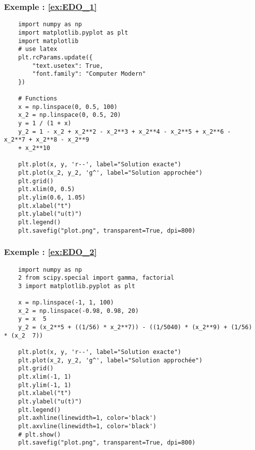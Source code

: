 \subsubsection*{Exemple : \ref{ex:EDO_1}}

\noindent
\begin{verbatim}
    import numpy as np
    import matplotlib.pyplot as plt
    import matplotlib
    # use latex
    plt.rcParams.update({
        "text.usetex": True,
        "font.family": "Computer Modern"
    })
    
    # Functions
    x = np.linspace(0, 0.5, 100)
    x_2 = np.linspace(0, 0.5, 20)
    y = 1 / (1 + x)
    y_2 = 1 - x_2 + x_2**2 - x_2**3 + x_2**4 - x_2**5 + x_2**6 - x_2**7 + x_2**8 - x_2**9 
    + x_2**10
    
    plt.plot(x, y, 'r--', label="Solution exacte")
    plt.plot(x_2, y_2, 'g^', label="Solution approchée")
    plt.grid()
    plt.xlim(0, 0.5)
    plt.ylim(0.6, 1.05)
    plt.xlabel("t")
    plt.ylabel("u(t)")
    plt.legend()
    plt.savefig("plot.png", transparent=True, dpi=800)
\end{verbatim}
\subsubsection*{Exemple : \ref{ex:EDO_2}}

\noindent
\begin{verbatim}
    import numpy as np
    2 from scipy.special import gamma, factorial
    3 import matplotlib.pyplot as plt
    
    x = np.linspace(-1, 1, 100)
    x_2 = np.linspace(-0.98, 0.98, 20)
    y = x  5
    y_2 = (x_2**5 + ((1/56) * x_2**7)) - ((1/5040) * (x_2**9) + (1/56) * (x_2  7))
    
    plt.plot(x, y, 'r--', label="Solution exacte")
    plt.plot(x_2, y_2, 'g^', label="Solution approchée")
    plt.grid()
    plt.xlim(-1, 1)
    plt.ylim(-1, 1)
    plt.xlabel("t")
    plt.ylabel("u(t)")
    plt.legend()
    plt.axhline(linewidth=1, color='black')
    plt.axvline(linewidth=1, color='black')
    # plt.show()
    plt.savefig("plot.png", transparent=True, dpi=800)
\end{verbatim}
